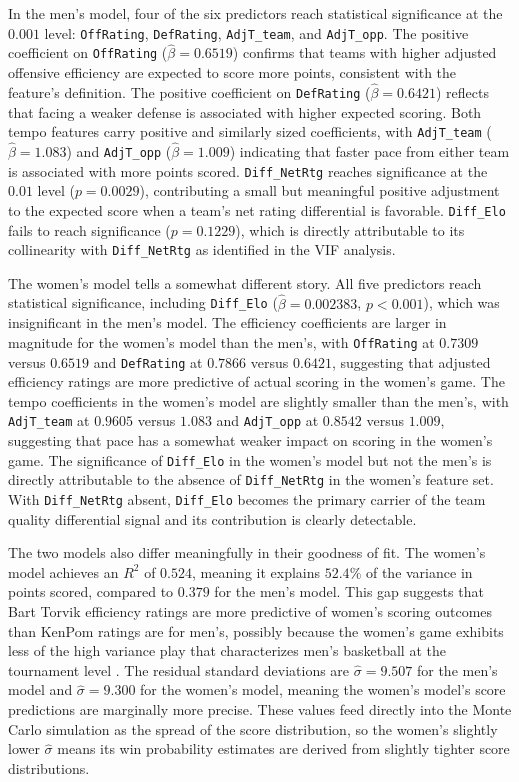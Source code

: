 \documentclass[12pt,leqno]{article}\usepackage[pdftex]{graphicx}\usepackage[dvipsnames]{xcolor}
\theoremstyle{remark}
\begin{document}
In the men's model, four of the six predictors reach statistical significance at the $0.001$ level: \texttt{OffRating}, \texttt{DefRating}, \texttt{AdjT\_team}, and \texttt{AdjT\_opp}. The positive coefficient on \texttt{OffRating} ($\hat{\beta} = 0.6519$) confirms that teams with higher adjusted offensive efficiency are expected to score more points, consistent with the feature's definition. The positive coefficient on \texttt{DefRating} ($\hat{\beta} = 0.6421$) reflects that facing a weaker defense is associated with higher expected scoring. Both tempo features carry positive and similarly sized coefficients, with \texttt{AdjT\_team} ($\hat{\beta} = 1.083$) and \texttt{AdjT\_opp} ($\hat{\beta} = 1.009$) indicating that faster pace from either team is associated with more points scored. \texttt{Diff\_NetRtg} reaches significance at the $0.01$ level ($p = 0.0029$), contributing a small but meaningful positive adjustment to the expected score when a team's net rating differential is favorable. \texttt{Diff\_Elo} fails to reach significance ($p = 0.1229$), which is directly attributable to its collinearity with \texttt{Diff\_NetRtg} as identified in the VIF analysis.

The women's model tells a somewhat different story. All five predictors reach statistical significance, including \texttt{Diff\_Elo} ($\hat{\beta} = 0.002383$, $p < 0.001$), which was insignificant in the men's model. The efficiency coefficients are larger in magnitude for the women's model than the men's, with \texttt{OffRating} at $0.7309$ versus $0.6519$ and \texttt{DefRating} at $0.7866$ versus $0.6421$, suggesting that adjusted efficiency ratings are more predictive of actual scoring in the women's game. The tempo coefficients in the women's model are slightly smaller than the men's, with \texttt{AdjT\_team} at $0.9605$ versus $1.083$ and \texttt{AdjT\_opp} at $0.8542$ versus $1.009$, suggesting that pace has a somewhat weaker impact on scoring in the women's game. The significance of \texttt{Diff\_Elo} in the women's model but not the men's is directly attributable to the absence of \texttt{Diff\_NetRtg} in the women's feature set. With \texttt{Diff\_NetRtg} absent, \texttt{Diff\_Elo} becomes the primary carrier of the team quality differential signal and its contribution is clearly detectable.

The two models also differ meaningfully in their goodness of fit. The women's model achieves an $R^2$ of $0.524$, meaning it explains $52.4\%$ of the variance in points scored, compared to $0.379$ for the men's model. This gap suggests that Bart Torvik efficiency ratings are more predictive of women's scoring outcomes than KenPom ratings are for men's, possibly because the women's game exhibits less of the high variance play that characterizes men's basketball at the tournament level \cite{parity}. The residual standard deviations are $\hat{\sigma} = 9.507$ for the men's model and $\hat{\sigma} = 9.300$ for the women's model, meaning the women's model's score predictions are marginally more precise. These values feed directly into the Monte Carlo simulation as the spread of the score distribution, so the women's slightly lower $\hat{\sigma}$ means its win probability estimates are derived from slightly tighter score distributions.
\end{document}
